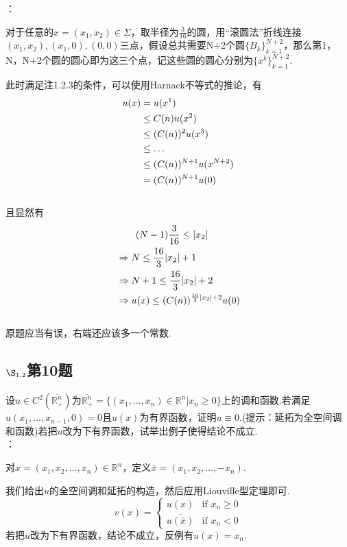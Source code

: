 \documentclass[12pt, a4paper]{article}
\begin{document}
	\songti{}
	：
	
	对于任意的$x=(x_1,x_2)\in \Sigma$，取半径为$\frac{3}{16}$的圆，用“滚圆法”折线连接$(x_1,x_2),(x_1,0),(0,0)$三点，假设总共需要N+2个圆$\{B_k\}_{k=1}^{N+2}$，那么第1，N，N+2个圆的圆心即为这三个点，记这些圆的圆心分别为$\{x^k\}_{k=1}^{N+2}$.
	
	
	此时满足注1.2.3的条件，可以使用Harnack不等式的推论，有
	\begin{align}
		u(x)&=u(x^1)\notag \\
		&\le C(n)u(x^2) \notag\\
		&\le (C(n))^2 u(x^3) \notag \\
		&\le \dots \notag \\
		&\le (C(n))^{N+1}u(x^{N+2}) \notag \\
		&= (C(n))^{N+1}u(0) \notag
	\end{align}\\
	且显然有
	\begin{align}
		&\qquad (N-1)\frac{3}{16} \le |x_2|	\notag \\
		&\Rightarrow N \le \frac{16}{3}|x_2| +1 \notag \\
		&\Rightarrow N+1 \le \frac{16}{3}|x_2| +2 \notag \\
		&\Rightarrow u(x) \le (C(n))^{\frac{16}{3}|x_2| +2}u(0) \notag 
	\end{align}\\
	原题应当有误，右端还应该多一个常数.\\
	
	\subsection{$\S_{1.2}$第10题}
	\kaishu{}
	设$u \in C^2(\overline{\mathbb{R}_{+}^{n}})$为$\overline{\mathbb{R}_{+}^n}=\{(x_1,\dots,x_n)\in \mathbb{R}^n|x_n \ge 0\}$上的调和函数.若满足$u(x_1,\dots,x_{n-1},0)=0$且$u(x)$为有界函数，证明$u\equiv 0$.(提示：延拓为全空间调和函数)若把$u$改为下有界函数，试举出例子使得结论不成立.\\
	
	\songti{}
	：
	
	对$x=(x_1,x_2,\dots,x_n)\in \mathbb{R}^n$，定义$\bar{x}=(x_1,x_2,\dots,-x_n)$.	

	我们给出$u$的全空间调和延拓的构造，然后应用Liouville型定理即可.$$
	v(x)=\begin{cases}
	u(x) & \text{if } x_n \ge 0\\
	\overline{u(\bar{x})} & \text{if } x_n < 0
	\end{cases}$$
	若把$u$改为下有界函数，结论不成立，反例有$u(x)=x_n$.
	
\end{document}
